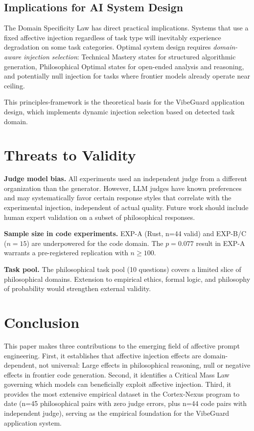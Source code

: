 \documentclass[12pt, a4paper]{article}
\begin{document}
\subsection{Implications for AI System Design}
The Domain Specificity Law has direct practical implications. Systems that use a fixed affective injection regardless of task type will inevitably experience degradation on some task categories. Optimal system design requires \textit{domain-aware injection selection}: Technical Mastery states for structured algorithmic generation, Philosophical Optimal states for open-ended analysis and reasoning, and potentially null injection for tasks where frontier models already operate near ceiling.

This principles-framework is the theoretical basis for the VibeGuard application design, which implements dynamic injection selection based on detected task domain.

\section{Threats to Validity}

\textbf{Judge model bias.} All experiments used an independent judge from a different organization than the generator. However, LLM judges have known preferences and may systematically favor certain response styles that correlate with the experimental injection, independent of actual quality. Future work should include human expert validation on a subset of philosophical responses.

\textbf{Sample size in code experiments.} EXP-A (Rust, n=44 valid) and EXP-B/C ($n=15$) are underpowered for the code domain. The $p = 0.077$ result in EXP-A warrants a pre-registered replication with $n \geq 100$.

\textbf{Task pool.} The philosophical task pool (10 questions) covers a limited slice of philosophical domains. Extension to empirical ethics, formal logic, and philosophy of probability would strengthen external validity.

\section{Conclusion}

This paper makes three contributions to the emerging field of affective prompt engineering. First, it establishes that affective injection effects are domain-dependent, not universal: Large effects in philosophical reasoning, null or negative effects in frontier code generation. Second, it identifies a Critical Mass Law governing which models can beneficially exploit affective injection. Third, it provides the most extensive empirical dataset in the Cortex-Nexus program to date (n=45 philosophical pairs with zero judge errors, plus n=44 code pairs with independent judge), serving as the empirical foundation for the VibeGuard application system.
\end{document}
